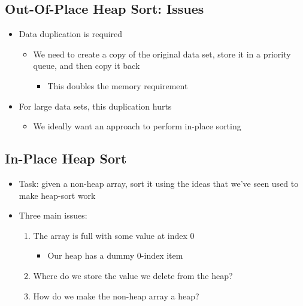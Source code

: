 \documentclass[
  10pt,
  english,
  letterpaper,
,tablecaptionabove
]{scrartcl}
\providecommand{\tightlist}{%
  \setlength{\itemsep}{0pt}\setlength{\parskip}{0pt}}
\begin{document}
\hypertarget{out-of-place-heap-sort-issues}{%
\subsection{Out-Of-Place Heap Sort:
Issues}\label{out-of-place-heap-sort-issues}}

\begin{itemize}
\tightlist
\item
  Data duplication is required

  \begin{itemize}
  \tightlist
  \item
    We need to create a copy of the original data set, store it in a
    priority queue, and then copy it back

    \begin{itemize}
    \tightlist
    \item
      This doubles the memory requirement
    \end{itemize}
  \end{itemize}
\item
  For large data sets, this duplication hurts

  \begin{itemize}
  \tightlist
  \item
    We ideally want an approach to perform in-place sorting
  \end{itemize}
\end{itemize}

\hypertarget{in-place-heap-sort}{%
\subsection{In-Place Heap Sort}\label{in-place-heap-sort}}

\begin{itemize}
\tightlist
\item
  Task: given a non-heap array, sort it using the ideas that we've seen
  used to make heap-sort work
\item
  Three main issues:

  \begin{enumerate}
  \def\labelenumi{\arabic{enumi}.}
  \tightlist
  \item
    The array is full with some value at index 0

    \begin{itemize}
    \tightlist
    \item
      Our heap has a dummy 0-index item
    \end{itemize}
  \item
    Where do we store the value we delete from the heap?
  \item
    How do we make the non-heap array a heap?
  \end{enumerate}
\end{itemize}
\end{document}
